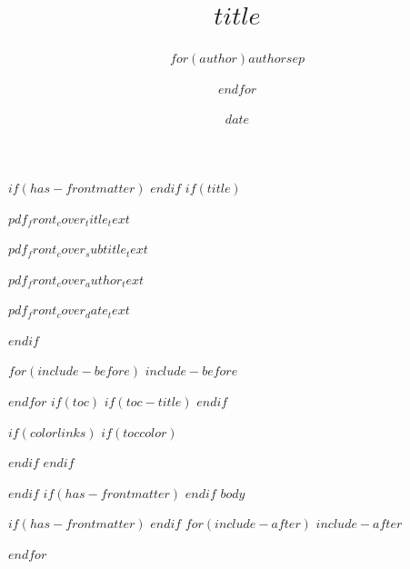 \documentclass[
$for(babel-otherlangs)$
  $babel-otherlangs$,
$endfor$
$if(babel-lang)$
  $babel-lang$,
$endif$
$if(fontsize)$
  $fontsize$,
$endif$
$if(papersize)$
  $papersize$paper,
$endif$
$for(classoption)$
  $classoption$$sep$,
$endfor$
]{$documentclass$}
\title{$title$}
\author{$for(author)$$author$$sep$ \and $endfor$}
\date{$date$}
\providecommand{\hypersetup}[1]{}
\let\frontmatter\relax%
\let\mainmatter\relax%
\renewcommand{\maketitle}{%
  \begin{titlepage}%
    \pagecolor{posterbg}%
    \color{posterfg}%
    \thispagestyle{empty}%
    \raggedright
    \vspace*{0.10\paperheight}
    {\fontsize{56pt}{56pt}\selectfont\bfseries $pdf_front_cover_title_text$ \par}
    \vspace{12pt}
    {\fontsize{18pt}{22pt}\selectfont $pdf_front_cover_subtitle_text$ \par}
    \vfill
    {\fontsize{12pt}{14pt}\selectfont $pdf_front_cover_author_text$ \par}
    {\fontsize{11pt}{13pt}\selectfont $pdf_front_cover_date_text$ \par}
  \end{titlepage}%
  \nopagecolor
  \color{ink}%
}
\begin{document}
$if(has-frontmatter)$
\frontmatter
$endif$
$if(title)$
\maketitle
$endif$

$for(include-before)$
$include-before$

$endfor$
$if(toc)$
$if(toc-title)$
\renewcommand*\contentsname{$toc-title$}
$endif$
{
$if(colorlinks)$
$if(toccolor)$
\hypersetup{linkcolor=$toccolor$}
$endif$
$endif$
\setcounter{tocdepth}{$toc-depth$}
\tableofcontents
}
$endif$
$if(has-frontmatter)$
\mainmatter
$endif$
$body$

$if(has-frontmatter)$
\backmatter
$endif$
$for(include-after)$
$include-after$

$endfor$
\end{document}
